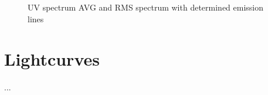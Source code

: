 \begin{figure}[!htbp]
	\centering
	\caption{UV spectrum AVG and RMS spectrum with determined emission lines}
	\label{fig:UV_uncalibrated_AVG_RMS}
\end{figure}


\section{Lightcurves}
...
